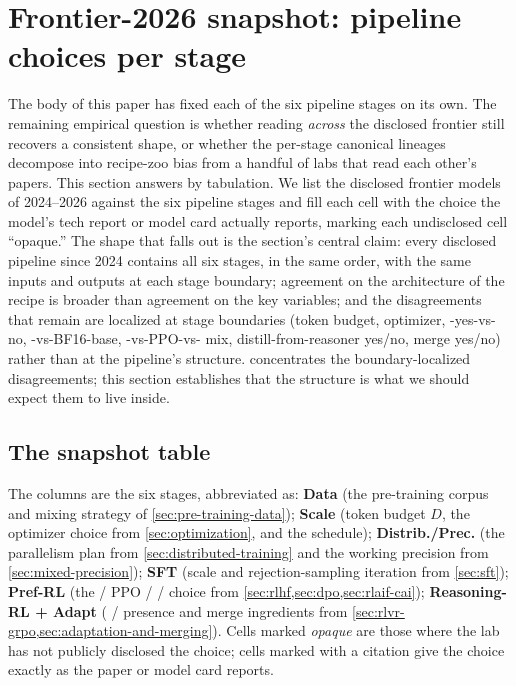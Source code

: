 
\section{Frontier-2026 snapshot: pipeline choices per stage}
\label{sec:frontier-snapshot}

The body of this paper has fixed each of the six pipeline stages on
its own. The remaining empirical question is whether reading
\emph{across} the disclosed frontier still recovers a consistent
shape, or whether the per-stage canonical lineages decompose into
recipe-zoo bias from a handful of labs that read each other's papers.
This section answers by tabulation. We list the disclosed frontier
models of 2024--2026 against the six pipeline stages and fill each
cell with the choice the model's tech report or model card actually
reports, marking each undisclosed cell ``opaque.'' The shape that
falls out is the section's central claim: every disclosed pipeline since
2024 contains all six stages, in the same order, with the same
inputs and outputs at each stage boundary; agreement on the
architecture of the recipe is broader than agreement on the
key variables; and the disagreements that remain are
localized at stage boundaries (token budget, optimizer, -yes-vs-no,
-vs-BF16-base, -vs-PPO-vs- mix, distill-from-reasoner
yes/no, merge yes/no) rather than at the
pipeline's structure.  concentrates the
boundary-localized disagreements; this section establishes that the
structure is what we should expect them to live inside.

\subsection{The snapshot table}
\label{sec:snap-table}

The columns are the six stages, abbreviated as: \textbf{Data} (the
pre-training corpus and mixing strategy of \cref{sec:pre-training-data});
\textbf{Scale} (token budget $D$, the optimizer choice from
\cref{sec:optimization}, and the schedule); \textbf{Distrib./Prec.}
(the parallelism plan from \cref{sec:distributed-training} and the
working precision from \cref{sec:mixed-precision}); \textbf{SFT}
(scale and rejection-sampling iteration from \cref{sec:sft});
\textbf{Pref-RL} (the  / PPO /  /  choice from
\cref{sec:rlhf,sec:dpo,sec:rlaif-cai}); \textbf{Reasoning-RL +
Adapt} ( /  presence and merge ingredients from
\cref{sec:rlvr-grpo,sec:adaptation-and-merging}). Cells marked
\emph{opaque} are those where the lab has not publicly disclosed the
choice; cells marked with a citation give the choice exactly as the
paper or model card reports.

